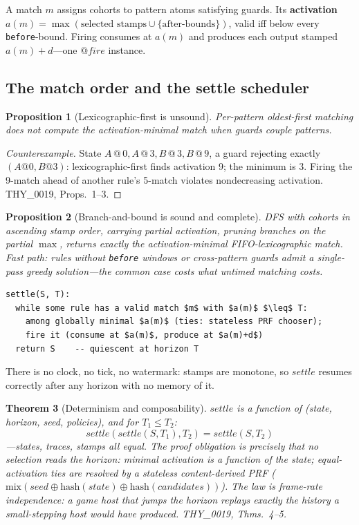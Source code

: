 \documentclass[11pt]{article}
\makeatletter
\newcommand{\stmp}[2]{#1\mathbin{@}#2}           %
\newcommand{\settle}{\mathit{settle}}
\newtheorem{theorem}{Theorem}[section]
\newtheorem{proposition}[theorem]{Proposition}
\theoremstyle{definition}
\theoremstyle{remark}
\makeatother
\begin{document}
A match $m$ assigns cohorts to pattern atoms satisfying guards.  Its
\textbf{activation} $a(m) = \max(\text{selected stamps} \cup \{\text{after-bounds}\})$,
valid iff below every \texttt{before}-bound.  Firing consumes at $a(m)$ and
produces each output stamped $a(m)+d$---one $\mathit{@fire}$ instance.

\subsection{The match order and the settle scheduler}

\begin{proposition}[Lexicographic-first is unsound]
\label{prop:lex-unsound}
Per-pattern oldest-first matching does not compute the activation-minimal match
when guards couple patterns.
\end{proposition}
\begin{proof}[Counterexample]
State $\stmp{A}{0}, \stmp{A}{3}, \stmp{B}{3}, \stmp{B}{9}$, a guard rejecting
exactly $(A@0, B@3)$: lexicographic-first finds activation 9; the minimum is 3.
Firing the 9-match ahead of another rule's 5-match violates nondecreasing
activation.  THY\_0019, Props.~1--3.
\end{proof}

\begin{proposition}[Branch-and-bound is sound and complete]
\label{prop:bab}
DFS with cohorts in ascending stamp order, carrying partial activation, pruning
branches on the partial $\max$, returns exactly the activation-minimal
FIFO-lexicographic match.  Fast path: rules without \texttt{before} windows or
cross-pattern guards admit a single-pass greedy solution---the common case costs
what untimed matching costs.
\end{proposition}

\begin{lstlisting}[caption={The settle scheduler (pseudocode).}]
settle(S, T):
  while some rule has a valid match $m$ with $a(m)$ $\leq$ T:
    among globally minimal $a(m)$ (ties: stateless PRF chooser);
    fire it (consume at $a(m)$, produce at $a(m)+d$)
  return S    -- quiescent at horizon T
\end{lstlisting}

There is no clock, no tick, no watermark: stamps are monotone, so $\settle$
resumes correctly after any horizon with no memory of it.

\begin{theorem}[Determinism and composability]
\label{thm:composability}
$\settle$ is a function of (state, horizon, seed, policies), and for
$T_1 \leq T_2$:
\[
  \settle(\settle(S,T_1),T_2) = \settle(S,T_2)
\]
---states, traces, stamps all equal.  The proof obligation is precisely that no
selection reads the horizon: minimal activation is a function of the state;
equal-activation ties are resolved by a \emph{stateless} content-derived PRF
($\mathrm{mix}(\mathit{seed} \oplus \mathrm{hash}(\mathit{state}) \oplus
\mathrm{hash}(\mathit{candidates}))$).  The law is frame-rate independence: a game
host that jumps the horizon replays exactly the history a small-stepping host
would have produced.  THY\_0019, Thms.~4--5.
\end{theorem}
\end{document}

